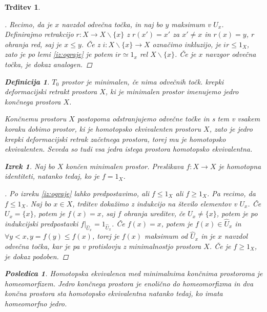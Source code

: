 \documentclass[a4paper,12pt]{article}
\theoremstyle{definition}
\newtheorem{definicija}{Definicija}
\theoremstyle{plain}
\newtheorem{izrek}{Izrek}
\theoremstyle{definition}
\theoremstyle{plain}
\newtheorem{trditev}{Trditev}
\theoremstyle{plain}
\newtheorem{posledica}{Posledica}
\theoremstyle{plain}
\theoremstyle{plain}
\newenvironment{dokaz}{\begin{proof}[\bfseries\upshape\proofname]}{\end{proof}}
\begin{document}
\begin{trditev}
\begin{dokaz}
Recimo, da je $x$ navzdol odvečna točka, in naj bo $y$ 
maksimum v $U_x$. Definirajmo retrakcijo $r:X\rightarrow 
X\backslash \{x\}$ z $r(x')=x'$ za $x'\neq x$ in $r(x)=y$, 
$r$ ohranja red, saj je $x\leq y$. Če z $i:X\backslash\{x\} 
\rightarrow X$ označimo inkluzijo, je $ir\leq 1_X$, zato je 
po lemi \ref{iz:ograje} je potem $ir \simeq 1_x$ rel 
$X\backslash\{x\}$. Če je $x$ navzgor odvečna točka, je 
dokaz analogen.
\end{dokaz}

\begin{definicija}
    $T_0$ prostor je \textit{minimalen}, če nima odvečnih točk. krepki deformacijski retrakt prostora $X$, ki je minimalen prostor imenujemo \textit{jedro} končnega prostora $X$.
\end{definicija}

Končnemu prostoru $X$ postopoma odstranjujemo odvečne točke in s tem v vsakem koraku dobimo prostor, ki je homotopsko ekvivalenten prostoru $X$, zato je jedro krepki deformacijski retrak začetnega prostora, torej mu je homotopsko ekvivalenten. Seveda so tudi vsa jedra istega prostora homotopsko ekvivalentna.

\begin{izrek}
    \label{iz:identiteta}
    Naj bo $X$ končen minimalen prostor. Preslikava $f:X\rightarrow X$ je homotopna identiteti, natanko tedaj, ko je $f=1_X$.
\end{izrek}

\begin{dokaz}
    Po izreku \ref{iz:ograje} lahko predpostavimo, ali 
    $f\leq 1_X$ ali $f\geq 1_X$. %
    Pa recimo, da $f\leq 1_X$. 
    Naj bo $x\in X$, trditev dokažimo z indukcijo na 
    število elementov v $U_x$. Če $U_x=\{x\}$, potem je 
    $f(x)=x$, saj $f$ ohranja ureditev, če $U_x\neq\{x\}$, potem 
    je po indukcijski predpostavki 
    $f|_{\hat{U}_x}=1_{\hat{U}_x}$. Če $f(x)=x$, potem je 
    $f(x)\in \hat{U}_x$ in $\forall y < x, y=f(y)\leq 
    f(x)$, torej je $f(x)$ maksimum od $\hat{U}_x$ in je 
    $x$ navzdol odvečna točka, kar je pa v protislovju 
    z minimalnostjo prostora $X$. Če je $f\geq 1_X$, je 
    dokaz podoben.
\end{dokaz}

\begin{posledica}
    Homotopska ekvivalenca med minimalnima končnima prostoroma je homeomorfizem. Jedro končnega prostora je enolično do homeomorfizma in dva končna prostora sta homotopsko ekvivalentna natanko tedaj, ko imata homeomorfno jedro.
\end{posledica}


\end{trditev}
\end{document}
